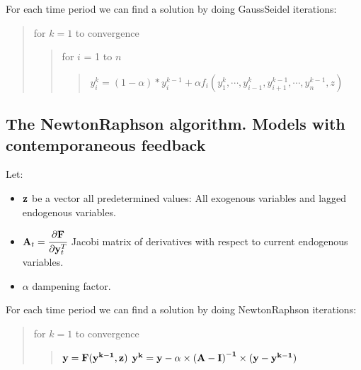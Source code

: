 \documentclass[letterpaper,10pt,english]{jupyterBook}
\begin{document}
\sphinxAtStartPar
For each time period we can find a solution by doing Gauss\sphinxhyphen{}Seidel iterations:
\begin{quote}

\sphinxAtStartPar
for \(k = 1\) to convergence
\begin{quote}

\sphinxAtStartPar
for \(i\) = 1 to \(n\)
\begin{quote}

\sphinxAtStartPar
\(y_{i}^{k} = (1-\alpha) * y_{i}^{{k-1}} + \alpha f_i(y_1^{k},\cdots,y_{i-1}^{k},y_{i+1}^{k-1},\cdots,y_{n}^{k-1},z)\)
\end{quote}
\end{quote}
\end{quote}


\subsection{The Newton\sphinxhyphen{}Raphson algorithm. Models with contemporaneous feedback}
\label{\detokenize{content/notebooks/intro/model and solution:the-newton-raphson-algorithm-models-with-contemporaneous-feedback}}
\sphinxAtStartPar
Let:
\begin{itemize}
\item {} 
\sphinxAtStartPar
\(\bf{z}\) be a vector all predetermined values: All exogenous variables and lagged endogenous variables.

\item {} 
\sphinxAtStartPar
\(\textbf{A}_t = \cfrac{\partial \textbf{F}}{\partial \textbf{y}_t^T}\) Jacobi matrix of derivatives with respect to current endogenous variables.

\item {} 
\sphinxAtStartPar
\(\alpha\) dampening factor.

\end{itemize}

\sphinxAtStartPar
For each time period we can find a solution by doing Newton\sphinxhyphen{}Raphson iterations:
\begin{quote}

\sphinxAtStartPar
for \(k = 1\) to convergence
\begin{quote}

\sphinxAtStartPar
\(\bf{y} = \bf{F(y^{k-1},z)}\)
\(\bf{y}^{k} =  \bf{y} - \alpha \times  \bf{(A-I)}^{-1} \times ( \bf{y - y^{k-1} })\)
\end{quote}
\end{quote}
\end{document}
